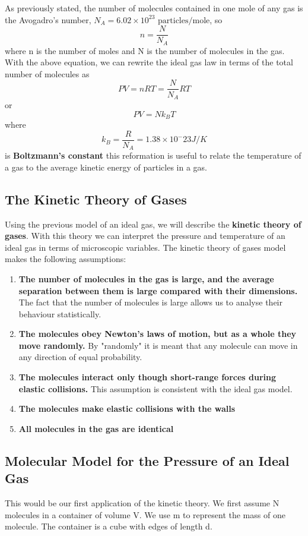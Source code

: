 As previously stated, the number of molecules contained in one mole of any gas is the Avogadro's number, $N_A = 6.02 \times 10^{23} \textrm{ particles/mole}$, so
$$n=\frac{N}{N_A}$$
where n is the number of moles and N is the number of molecules in the gas. With the above equation, we can rewrite the ideal gas law in terms of the total number of molecules as
$$PV=nRT = \frac{N}{N_A}RT$$
or
$$PV=Nk_BT$$
where
$$k_B=\frac{R}{N_A} = 1.38 \times 10^-23 J/K$$
is \textbf{Boltzmann's constant} this reformation is useful to relate the temperature of a gas to the average kinetic energy of particles in a gas.

\subsection{The Kinetic Theory of Gases}
 Using the previous model of an ideal gas, we will describe the \textbf{kinetic theory of gases}. With this theory we can interpret the pressure and temperature of an ideal gas in terms of microscopic variables. The kinetic theory of gases model makes the following assumptions:
\begin{enumerate}
\item \textbf{The number of molecules in the gas is large, and the average separation between them is large compared with their dimensions.} The fact that the number of molecules is large allows us to analyse their behaviour statistically.
\item \textbf{The molecules obey Newton's laws of motion, but as a whole they move randomly.} By "randomly" it is meant that any molecule can move in any direction of equal probability.
\item \textbf{The molecules interact only though short-range forces during elastic collisions.} This assumption is consistent with the ideal gas model.
\item \textbf{The molecules make elastic collisions with the walls}
\item \textbf{All molecules in the gas are identical}
\end{enumerate}

\subsection{Molecular Model for the Pressure of an Ideal Gas}
This would be our first application of the kinetic theory. We first assume N molecules in a container of volume V. We use m to represent the mass of one molecule. The container is a cube with edges of length d.

